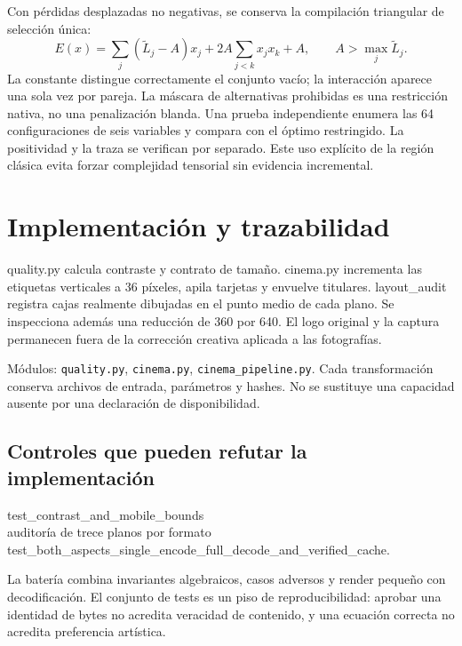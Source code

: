\documentclass[10pt,a4paper]{article}
\begin{document}
Con pérdidas desplazadas no negativas, se conserva la compilación triangular de selección única:
\begin{equation}
E(x)=\sum_j(\widetilde L_j-A)x_j+2A\sum_{j<k}x_jx_k+A,\qquad A>\max_j\widetilde L_j.
\end{equation}
La constante distingue correctamente el conjunto vacío; la interacción aparece una sola vez por pareja. La máscara de alternativas prohibidas es una restricción nativa, no una penalización blanda. Una prueba independiente enumera las 64 configuraciones de seis variables y compara con el óptimo restringido. La positividad y la traza se verifican por separado. Este uso explícito de la región clásica evita forzar complejidad tensorial sin evidencia incremental.
\section{Implementación y trazabilidad}
quality.py calcula contraste y contrato de tamaño. cinema.py incrementa las etiquetas verticales a 36 píxeles, apila tarjetas y envuelve titulares. layout\_\allowbreak{}audit registra cajas realmente dibujadas en el punto medio de cada plano. Se inspecciona además una reducción de 360 por 640. El logo original y la captura permanecen fuera de la corrección creativa aplicada a las fotografías.

Módulos: \texttt{quality.py}, \texttt{cinema.py}, \texttt{cinema\_\allowbreak{}pipeline.py}. Cada transformación conserva archivos de entrada, parámetros y hashes. No se sustituye una capacidad ausente por una declaración de disponibilidad.
\subsection{Controles que pueden refutar la implementación}
\begin{flushleft}\small test\_\allowbreak{}contrast\_\allowbreak{}and\_\allowbreak{}mobile\_\allowbreak{}bounds\\ auditoría de trece planos por formato\\ test\_\allowbreak{}both\_\allowbreak{}aspects\_\allowbreak{}single\_\allowbreak{}encode\_\allowbreak{}full\_\allowbreak{}decode\_\allowbreak{}and\_\allowbreak{}verified\_\allowbreak{}cache.\end{flushleft}

La batería combina invariantes algebraicos, casos adversos y render pequeño con decodificación. El conjunto de tests es un piso de reproducibilidad: aprobar una identidad de bytes no acredita veracidad de contenido, y una ecuación correcta no acredita preferencia artística.
\end{document}
